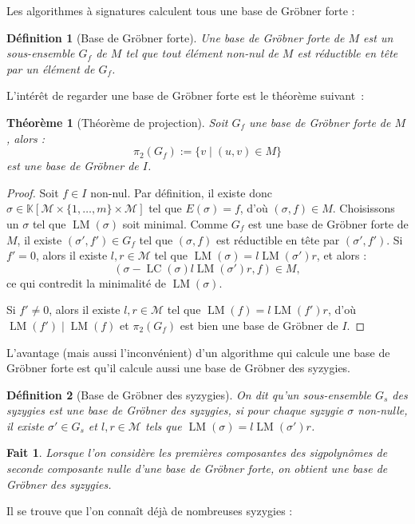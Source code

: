 \documentclass{article}
\newtheorem*{thm}{Théorème}
\newtheorem*{fact}{Fait}
\newtheorem*{dfn}{Définition}
\newcommand{\K}{\mathbb{K}}
\newcommand{\M}{\mathcal{M}}
\newcommand{\CR}{\K[\M\times\{1, \dots, m\}\times\M]}
\DeclareMathOperator{\LM}{LM}
\DeclareMathOperator{\LC}{LC}
\begin{document}
Les algorithmes à signatures calculent tous une base de Gröbner forte :

\begin{dfn}[Base de Gröbner forte]
	Une base de Gröbner forte de $M$ est un sous-ensemble $G_f$ de $M$ tel que tout élément non-nul de $M$ est réductible en tête par un élément de $G_f$.
\end{dfn}

L'intérêt de regarder une base de Gröbner forte est le théorème suivant~:

\begin{thm}[Théorème de projection]
	Soit $G_f$ une base de Gröbner forte de $M$, alors :
	$$\pi_2(G_f) := \{v \;|\; (u, v) \in M\}$$
	est une base de Gröbner de $I$.
\end{thm}
\begin{proof}
	Soit $f \in I$ non-nul. Par définition, il existe donc $\sigma \in \CR$ tel que $E(\sigma) = f$, d'où $(\sigma, f) \in M$. Choisissons un $\sigma$ tel que $\LM(\sigma)$ soit minimal.
	Comme $G_f$ est une base de Gröbner forte de $M$, il existe $(\sigma', f') \in G_f$ tel que $(\sigma, f)$ est réductible en tête par $(\sigma', f')$.
	Si $f' = 0$, alors il existe $l, r \in \M$ tel que $\LM(\sigma) = l\LM(\sigma')r$, et alors :
	$$(\sigma - \LC(\sigma)l\LM(\sigma')r, f) \in M,$$
	ce qui contredit la minimalité de $\LM(\sigma)$.
	
	Si $f' \neq 0$, alors il existe $l, r \in \M$ tel que $\LM(f) = l\LM(f')r$, d'où $\LM(f') \;|\; \LM(f)$ et $\pi_2(G_f)$ est bien une base de Gröbner de $I$.
\end{proof}

L'avantage (mais aussi l'inconvénient) d'un algorithme qui calcule une base de Gröbner forte est qu'il calcule aussi une base de Gröbner des syzygies.

\begin{dfn}[Base de Gröbner des syzygies]
	On dit qu'un sous-ensemble $G_s$ des syzygies est une base de Gröbner des syzygies, si pour chaque syzygie $\sigma$ non-nulle, il existe $\sigma' \in G_s$ et $l, r \in \M$ tels que $\LM(\sigma) = l\LM(\sigma')r$.
\end{dfn}

\begin{fact}
Lorsque l'on considère les premières composantes des sigpolynômes de seconde composante nulle d'une base de Gröbner forte, on obtient une base de Gröbner des syzygies.
\end{fact}

Il se trouve que l'on connaît déjà de nombreuses syzygies :
\end{document}
